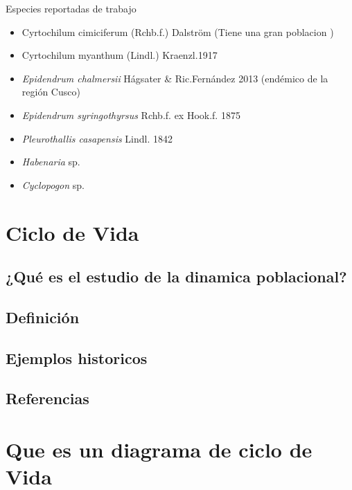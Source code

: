 \documentclass[
]{book}
\theoremstyle{definition}
\theoremstyle{definition}
\theoremstyle{definition}
\theoremstyle{definition}
\theoremstyle{remark}
\begin{document}
Especies reportadas de trabajo

\begin{itemize}
\item
  Cyrtochilum cimiciferum (Rchb.f.) Dalström (Tiene una gran poblacion
  )
\item
  Cyrtochilum myanthum (Lindl.) Kraenzl.1917
\item
  \emph{Epidendrum chalmersii} Hágsater \& Ric.Fernández 2013 (endémico de
  la región Cusco)
\item
  \emph{Epidendrum syringothyrsus} Rchb.f. ex Hook.f. 1875
\item
  \emph{Pleurothallis casapensis} Lindl. 1842
\item
  \emph{Habenaria} sp.
\item
  \emph{Cyclopogon} sp.
\end{itemize}

\hypertarget{ciclo-de-vida}{%
\chapter{Ciclo de Vida}\label{ciclo-de-vida}}

\hypertarget{quuxe9-es-el-estudio-de-la-dinamica-poblacional}{%
\section{¿Qué es el estudio de la dinamica poblacional?}\label{quuxe9-es-el-estudio-de-la-dinamica-poblacional}}

\hypertarget{definiciuxf3n}{%
\section{Definición}\label{definiciuxf3n}}

\hypertarget{ejemplos-historicos}{%
\section{Ejemplos historicos}\label{ejemplos-historicos}}

\hypertarget{referencias}{%
\section{Referencias}\label{referencias}}

\hypertarget{que-es-un-diagrama-de-ciclo-de-vida}{%
\chapter{Que es un diagrama de ciclo de Vida}\label{que-es-un-diagrama-de-ciclo-de-vida}}
\end{document}
